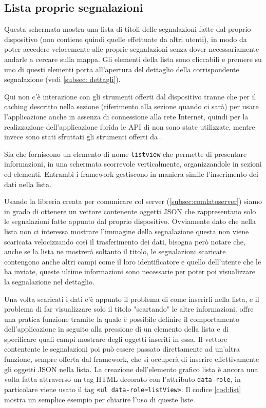 		\subsection{Lista proprie segnalazioni}
			Questa schermata mostra una lista di titoli delle segnalazioni fatte
			dal proprio dispositivo (non contiene quindi quelle effettuate da altri 
			utenti), in modo da poter accedere velocemente alle proprie segnalazioni 
			senza dover necessariamente andarle a cercare sulla mappa.
			Gli elementi della lista sono cliccabili e premere su uno di questi 
			elementi porta all'apertura del dettaglio della corrispondente 
			segnalazione (vedi \ref{subsec: dettagli}).
			
			Qui non c'è interazione con gli strumenti offerti dal dispositivo
			tranne che per il caching descritto nella sezione (riferimento alla 
			sezione quando ci sarà) per usare l'applicazione 
			anche in assenza di connessione alla rete Internet, 
			quindi per la realizzazione dell'applicazione ibrida le API di \pg{} 
			non sono state utilizzate, mentre invece sono 
			stati sfruttati gli strumenti offerti da \kendomob{}.
			
			Sia \kendomob{} che \tisdk{} forniscono un elemento di nome \texttt{listview}
			che permette di presentare informazioni, in una schermata scorrevole 
			verticalmente, organizzandole in sezioni ed elementi.
			Entrambi i framework gestiscono in maniera simile l'inserimento dei 
			dati nella lista.
			
			Usando la libreria creata per comunicare col server (\ref{subsec:comlatoserver})
			siamo in grado di ottenere un vettore contenente oggetti JSON che 
			rappresentano solo le segnalazioni fatte appunto dal proprio dispositivo. 
			Ovviamente dato che nella lista non ci interessa mostrare l'immagine della segnalazione
			questa non viene scaricata velocizzando così il 
			trasferimento dei dati, bisogna però notare che, anche se la lista 
			ne mostrerà soltanto il titolo, le segnalazioni scaricate contengono 
			anche altri campi come il loro identificatore e quello dell'utente 
			che le ha inviate, queste ultime informazioni sono necessarie per 
			poter poi visualizzare la segnalazione nel dettaglio.
			
			Una volta scaricati i dati c'è appunto il problema di come inserirli 
			nella lista, e il problema di far visualizzare solo il titolo 
			"scartando" le altre informazioni.
			\kendomob{} offre una pratica funzione \js{} tramite la quale è 
			possibile definire il comportamento dell'applicazione in seguito 
			alla pressione di un elemento della lista e di specificare quali 
			campi mostrare degli oggetti inseriti in essa. Il vettore contentente le segnalazioni
			poi può essere passato direttamente ad un'altra funzione,
			sempre offerta dal framework, che si occuperà di inserire effettivamente 
			gli oggetti JSON nella lista.
			La creazione dell'elemento grafico lista è ancora una volta fatta 
			attraverso un tag HTML decorato con l'attributo \texttt{data-role}, 
			in particolare viene usato il tag \texttt{<ul data-role=listView>}.
			Il codice \ref{cod:list} mostra un semplice esempio per 
			chiarire l'uso di queste liste.
			

